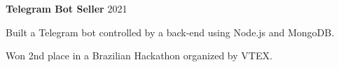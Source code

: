 \begin{entry}
	{{\bf Telegram Bot Seller}}
	{2021}
	
	Built a Telegram bot controlled by a back-end using Node.js and MongoDB.

	Won 2nd place in a Brazilian Hackathon organized by VTEX.
\end{entry}

